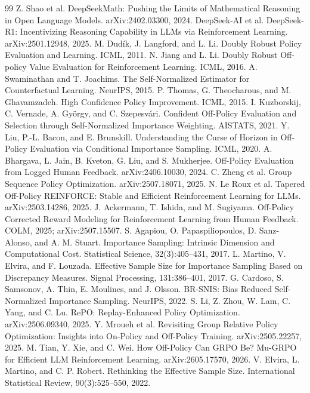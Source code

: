 \documentclass[10pt]{article}
\theoremstyle{remark}
\begin{document}
\begin{thebibliography}{99}
 Z. Shao et al. DeepSeekMath: Pushing the Limits of Mathematical Reasoning in Open Language Models. arXiv:2402.03300, 2024.
 DeepSeek-AI et al. DeepSeek-R1: Incentivizing Reasoning Capability in LLMs via Reinforcement Learning. arXiv:2501.12948, 2025.
 M. Dud\'ik, J. Langford, and L. Li. Doubly Robust Policy Evaluation and Learning. ICML, 2011.
 N. Jiang and L. Li. Doubly Robust Off-policy Value Evaluation for Reinforcement Learning. ICML, 2016.
 A. Swaminathan and T. Joachims. The Self-Normalized Estimator for Counterfactual Learning. NeurIPS, 2015.
 P. Thomas, G. Theocharous, and M. Ghavamzadeh. High Confidence Policy Improvement. ICML, 2015.
 I. Kuzborskij, C. Vernade, A. Gy\"orgy, and C. Szepesv\'ari. Confident Off-Policy Evaluation and Selection through Self-Normalized Importance Weighting. AISTATS, 2021.
 Y. Liu, P.-L. Bacon, and E. Brunskill. Understanding the Curse of Horizon in Off-Policy Evaluation via Conditional Importance Sampling. ICML, 2020.
 A. Bhargava, L. Jain, B. Kveton, G. Liu, and S. Mukherjee. Off-Policy Evaluation from Logged Human Feedback. arXiv:2406.10030, 2024.
 C. Zheng et al. Group Sequence Policy Optimization. arXiv:2507.18071, 2025.
 N. Le Roux et al. Tapered Off-Policy REINFORCE: Stable and Efficient Reinforcement Learning for LLMs. arXiv:2503.14286, 2025.
 J. Ackermann, T. Ishida, and M. Sugiyama. Off-Policy Corrected Reward Modeling for Reinforcement Learning from Human Feedback. COLM, 2025; arXiv:2507.15507.
 S. Agapiou, O. Papaspiliopoulos, D. Sanz-Alonso, and A. M. Stuart. Importance Sampling: Intrinsic Dimension and Computational Cost. Statistical Science, 32(3):405--431, 2017.
 L. Martino, V. Elvira, and F. Louzada. Effective Sample Size for Importance Sampling Based on Discrepancy Measures. Signal Processing, 131:386--401, 2017.
 G. Cardoso, S. Samsonov, A. Thin, E. Moulines, and J. Olsson. BR-SNIS: Bias Reduced Self-Normalized Importance Sampling. NeurIPS, 2022.
 S. Li, Z. Zhou, W. Lam, C. Yang, and C. Lu. RePO: Replay-Enhanced Policy Optimization. arXiv:2506.09340, 2025.
 Y. Mroueh et al. Revisiting Group Relative Policy Optimization: Insights into On-Policy and Off-Policy Training. arXiv:2505.22257, 2025.
 M. Tian, Y. Xie, and C. Wei. How Off-Policy Can GRPO Be? Mu-GRPO for Efficient LLM Reinforcement Learning. arXiv:2605.17570, 2026.
 V. Elvira, L. Martino, and C. P. Robert. Rethinking the Effective Sample Size. International Statistical Review, 90(3):525--550, 2022.
\end{thebibliography}
\end{document}
